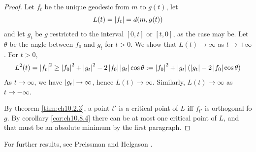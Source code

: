 \documentclass[../main]{subfiles}
\begin{document}
\begin{proof}
Let $f_t$ be the unique geodesic from $m$ to $g(t)$, let
\[L(t)=\left|f_t\right|=d(m,g(t))\]
and let $g_t$ be $g$ restricted to the interval $[0,t]$ or $[t,0]$, as the case may be. Let $\theta$ be the angle between $f_0$ and $g_t$ for $t>0$. We show that $L(t)\to\infty$ as $t\to\pm\infty$. For $t>0$,
\[L^2(t) = \left|f_t\right|^2 \ge \left|f_0\right|^2 + \left|g_t\right|^2 - 2\left|f_0\right|\left|g_t\right|\cos\theta
:= \left|f_0\right|^2 + \left|g_t\right|(\left|g_t\right|-2\left|f_0\right|\cos\theta)\]
As $t\to\infty$, we have $\left|g_t\right|\to\infty$, hence $L(t)\to\infty$. Similarly, $L(t)\to\infty$ as $t\to-\infty$.

By theorem \ref{thm:ch10.2.3}, a point $t'$ is a critical point of $L$ iff $f_{t'}$ is orthogonal fo $g$. By corollary \ref{cor:ch10.8.4} there can be at most one critical point of $L$, and that must be an absolute minimum by the first paragraph.
\end{proof}

For further results, see Preissman \cite{Preissmann1943quelques} and Helgason \cite{helgason2012differential}.
\end{document}

